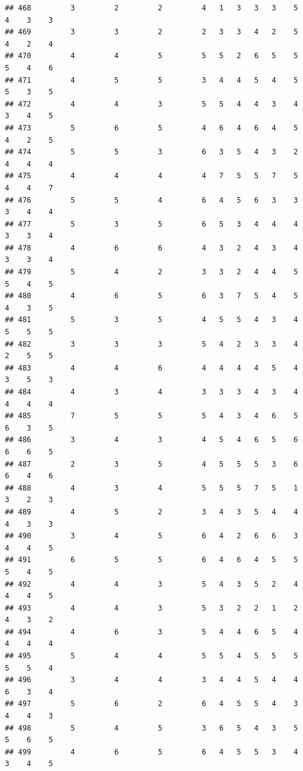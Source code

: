 \documentclass[
]{article}
\begin{document}
\begin{verbatim}
## 468         3         2         2         4   1   3   3   3    5    4    3    3
## 469         3         3         2         2   3   3   4   2    5    4    2    4
## 470         4         4         5         5   5   2   6   5    5    5    4    6
## 471         4         5         5         3   4   4   5   4    5    5    3    5
## 472         4         4         3         5   5   4   4   3    4    3    4    5
## 473         5         6         5         4   6   4   6   4    5    4    2    5
## 474         5         5         3         6   3   5   4   3    2    4    4    4
## 475         4         4         4         4   7   5   5   7    5    4    4    7
## 476         5         5         4         6   4   5   6   3    3    3    4    4
## 477         5         3         5         6   5   3   4   4    4    3    3    4
## 478         4         6         6         4   3   2   4   3    4    3    3    4
## 479         5         4         2         3   3   2   4   4    5    5    4    5
## 480         4         6         5         6   3   7   5   4    5    4    3    5
## 481         5         3         5         4   5   5   4   3    4    5    5    5
## 482         3         3         3         5   4   2   3   3    4    2    5    5
## 483         4         4         6         4   4   4   4   5    4    3    5    3
## 484         4         3         4         3   3   3   4   3    4    4    4    4
## 485         7         5         5         5   4   3   4   6    5    6    3    5
## 486         3         4         3         4   5   4   6   5    6    6    6    5
## 487         2         3         5         4   5   5   5   3    6    6    4    6
## 488         4         3         4         5   5   5   7   5    1    3    2    3
## 489         4         5         2         3   4   3   5   4    4    4    3    3
## 490         3         4         5         6   4   2   6   6    3    4    4    5
## 491         6         5         5         6   4   6   4   5    5    5    4    5
## 492         4         4         3         5   4   3   5   2    4    4    4    5
## 493         4         4         3         5   3   2   2   1    2    4    3    2
## 494         4         6         3         5   4   4   6   5    4    4    4    4
## 495         5         4         4         5   5   4   5   5    5    5    5    4
## 496         3         4         4         3   4   4   5   4    4    6    3    4
## 497         5         6         2         6   4   5   5   4    3    4    4    3
## 498         5         4         5         3   6   5   4   3    5    5    6    5
## 499         4         6         5         6   4   5   5   3    4    3    4    5

\end{verbatim}
\end{document}
